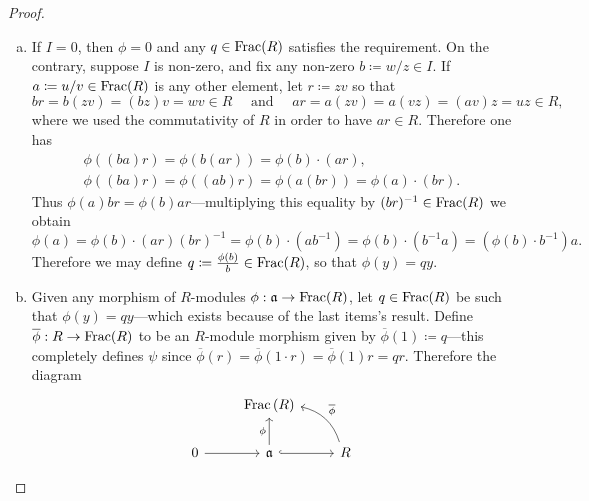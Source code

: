 \begin{proof}
    \begin{enumerate}[(a)]\setlength\itemsep{0em}
        \item If \(I = 0\), then \(\phi = 0\) and any \(q \in \operatorname{Frac}(R)\) satisfies the
              requirement. On the contrary, suppose \(I\) is non-zero, and fix any non-zero
              \(b \coloneq w/z \in I\). If \(a \coloneq u/v \in \operatorname{Frac}(R)\) is any other
              element, let \(r \coloneq z v\) so that
              \[
                  b r = b (z v) = (b z) v = w v \in R
                  \quad\text{ and }\quad
                  a r = a(z v) = a(v z) = (a v) z = u z \in R,
              \]
              where we used the commutativity of \(R\) in order to have \(a r \in
              R\). Therefore one has
              \begin{gather*}
                  \phi((b a) r) = \phi(b (a r)) = \phi(b) \cdot (a r), \\
                  \phi((b a) r) = \phi((a b) r) = \phi(a (b r)) = \phi(a) \cdot (b r).
              \end{gather*}
              Thus \(\phi(a) b r = \phi(b) a r\)---multiplying this equality by
              \((b r)^{-1} \in \operatorname{Frac}(R)\) we obtain
              \[
                  \phi(a)
                  = \phi(b) \cdot (a r) (b r)^{-1}
                  = \phi(b) \cdot (a b^{-1})
                  = \phi(b) \cdot (b^{-1} a)
                  = (\phi(b) \cdot b^{-1}) a.
              \]
              Therefore we may define \(q \coloneq \frac{\phi(b)}{b} \in \operatorname{Frac}(R)\), so that
              \(\phi(y) = q y\).

        \item Given any morphism of \(R\)-modules \(\phi: \mathfrak{a} \to \operatorname{Frac}(R)\), let
              \(q \in \operatorname{Frac}(R)\) be such that \(\phi(y) = q y\)---which exists because of
              the last items's result. Define \(\overline{\phi}: R \to \operatorname{Frac}(R)\) to be an
              \(R\)-module morphism given by \(\overline{\phi}(1) \coloneq q\)---this
              completely defines \(\psi\) since
              \(\overline{\phi}(r) = \overline{\phi}(1 \cdot r) = \overline{\phi}(1) r = q
              r\). Therefore the diagram
              \[
                  \begin{tikzcd}
                      &\Frac{(R)} &
                      \\
                      0 \ar[r] &\ideal a \ar[r, hook] \ar[u, "\phi"]
                      &R \ar[lu, bend right, "\overline{\phi}"']
                  \end{tikzcd}
              \]
    \end{enumerate}
\end{proof}

